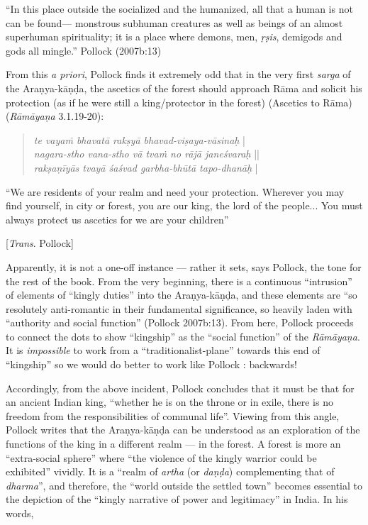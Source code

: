 \newpage

\begin{myquote}
“In this place outside the socialized and the humanized, all that a human is not can be found--- monstrous subhuman creatures as well as beings of an almost superhuman spirituality; it is a place where demons, men, {\sl ṛṣis}, demigods and gods all mingle.”
\hfill	 Pollock (2007b:13)
\end{myquote}

From this {\sl a priori}, Pollock finds it extremely odd that in the very first {\sl sarga} of the Araṇya-kāṇḍa, the ascetics of the forest should approach Rāma and solicit his protection (as if he were still a king/protector in the forest)  (Ascetics to Rāma) ({\sl Rāmāyaṇa} 3.1.19-20):
\begin{quote}
{{\sl te vayaṁ bhavatā rakṣyā bhavad-viṣaya-vāsinaḥ}} |\\
{\sl nagara-stho vana-stho vā tvaṁ no rājā janeśvaraḥ} ||\\
{\sl rakṣaṇīyās tvayā śaśvad garbha-bhūtā tapo-dhanāḥ} |
\end{quote}

\begin{myquote}
“We are residents of your realm and need your protection. Wherever you may find yourself, in city or forest, you are our king, the lord of the people... You must always protect us ascetics for we are your children” 

\hfill[{\sl Trans}. Pollock]
\end{myquote}

Apparently, it is not a one-off instance --- rather it sets, says Pollock, the tone for the rest of the book. From the very beginning, there is a continuous “intrusion” of elements of “kingly duties” into the Araṇya-kāṇḍa, and these elements are “so resolutely anti-romantic in their fundamental significance, so heavily laden with “authority and social function” (Pollock 2007b:13). From here, Pollock proceeds to connect the dots to show “kingship” as the “social function” of the {\sl Rāmāyaṇa}.  It is {\sl impossible} to work from a “traditionalist-plane” towards this end of “kingship” so we would do better to work like Pollock : backwards!

Accordingly, from the above incident, Pollock concludes that it must be that for an ancient Indian king, “whether he is on the throne or in exile, there is no freedom from the responsibilities of communal life”.  Viewing from this angle, Pollock writes that the Araṇya-kāṇḍa can be understood as an exploration of the functions of the king in a different realm --- in the forest. A forest is more an “extra-social sphere” where “the violence of the kingly warrior could be exhibited” vividly. It is a “realm of {\sl artha} (or {\sl daṇḍa}) complementing that of {\sl dharma}”, and therefore, the “world outside the settled town” becomes essential to the depiction of the “kingly narrative of power and legitimacy” in India. In his words, 

